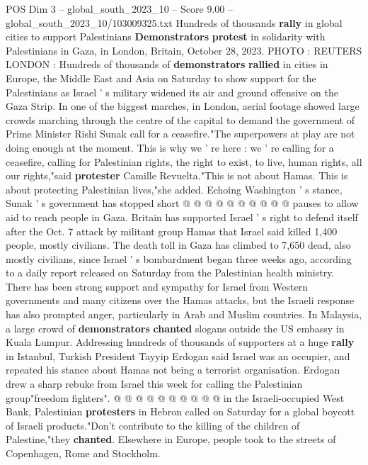 \begin{textsample}{POS Dim 3 – global\_south\_2023\_10 – Score 9.00 – global\_south\_2023\_10/103009325.txt}  \label{ex:f3_pos_433}
Hundreds of thousands \textbf{rally} in global cities to support Palestinians \textbf{Demonstrators} \textbf{protest} in solidarity with Palestinians in Gaza, in London, Britain, October 28, 2023.
PHOTO : REUTERS LONDON : Hundreds of thousands of \textbf{demonstrators} \textbf{rallied} in cities in Europe, the Middle East and Asia on Saturday to show support for the Palestinians as Israel ' s military widened its air and ground offensive on the Gaza Strip.
In one of the biggest marches, in London, aerial footage showed large crowds marching through the centre of the capital to demand the government of Prime Minister Rishi Sunak call for a ceasefire."The superpowers at play are not doing enough at the moment.
This is why we ' re here : we ' re calling for a ceasefire, calling for Palestinian rights, the right to exist, to live, human rights, all our rights,"said \textbf{protester} Camille Revuelta."This is not about Hamas.
This is about protecting Palestinian lives,"she added.
Echoing Washington ' s stance, Sunak ' s government has stopped short @ @ @ @ @ @ @ @ @ @ pauses to allow aid to reach people in Gaza.
Britain has supported Israel ' s right to defend itself after the Oct. 7 attack by militant group Hamas that Israel said killed 1,400 people, mostly civilians.
The death toll in Gaza has climbed to 7,650 dead, also mostly civilians, since Israel ' s bombardment began three weeks ago, according to a daily report released on Saturday from the Palestinian health ministry.
There has been strong support and sympathy for Israel from Western governments and many citizens over the Hamas attacks, but the Israeli response has also prompted anger, particularly in Arab and Muslim countries.
In Malaysia, a large crowd of \textbf{demonstrators} \textbf{chanted} slogans outside the US embassy in Kuala Lumpur.
Addressing hundreds of thousands of supporters at a huge \textbf{rally} in Istanbul, Turkish President Tayyip Erdogan said Israel was an occupier, and repeated his stance about Hamas not being a terrorist organisation.
Erdogan drew a sharp rebuke from Israel this week for calling the Palestinian group"freedom fighters". @ @ @ @ @ @ @ @ @ @ in the Israeli-occupied West Bank, Palestinian \textbf{protesters} in Hebron called on Saturday for a global boycott of Israeli products."Don't contribute to the killing of the children of Palestine,"they \textbf{chanted}.
Elsewhere in Europe, people took to the streets of Copenhagen, Rome and Stockholm.

\end{textsample}
